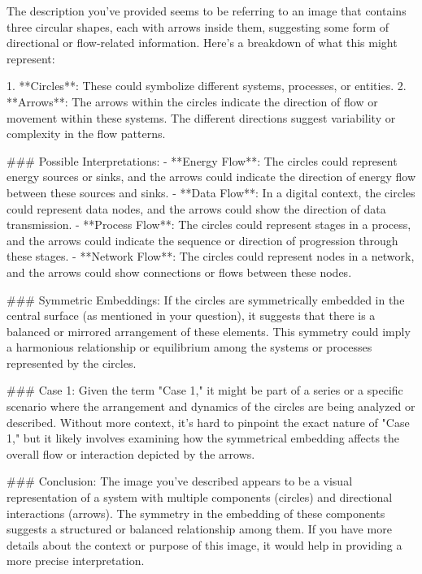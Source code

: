 The description you've provided seems to be referring to an image that contains three circular shapes, each with arrows inside them, suggesting some form of directional or flow-related information. Here's a breakdown of what this might represent:

1. **Circles**: These could symbolize different systems, processes, or entities.
2. **Arrows**: The arrows within the circles indicate the direction of flow or movement within these systems. The different directions suggest variability or complexity in the flow patterns.

### Possible Interpretations:
- **Energy Flow**: The circles could represent energy sources or sinks, and the arrows could indicate the direction of energy flow between these sources and sinks.
- **Data Flow**: In a digital context, the circles could represent data nodes, and the arrows could show the direction of data transmission.
- **Process Flow**: The circles could represent stages in a process, and the arrows could indicate the sequence or direction of progression through these stages.
- **Network Flow**: The circles could represent nodes in a network, and the arrows could show connections or flows between these nodes.

### Symmetric Embeddings:
If the circles are symmetrically embedded in the central surface (as mentioned in your question), it suggests that there is a balanced or mirrored arrangement of these elements. This symmetry could imply a harmonious relationship or equilibrium among the systems or processes represented by the circles.

### Case 1:
Given the term "Case 1," it might be part of a series or a specific scenario where the arrangement and dynamics of the circles are being analyzed or described. Without more context, it’s hard to pinpoint the exact nature of "Case 1," but it likely involves examining how the symmetrical embedding affects the overall flow or interaction depicted by the arrows.

### Conclusion:
The image you've described appears to be a visual representation of a system with multiple components (circles) and directional interactions (arrows). The symmetry in the embedding of these components suggests a structured or balanced relationship among them. If you have more details about the context or purpose of this image, it would help in providing a more precise interpretation.